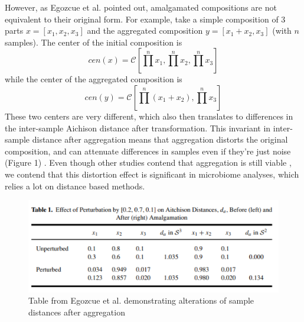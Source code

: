 \documentclass{article}
\begin{document}
\noindent However, as Egozcue et al. \cite{egozcue2005} pointed out, amalgamated compositions are not equivalent to their original form. For example, take a simple composition of 3 parts $x = [x_1, x_2, x_3]$ and the aggregated composition $y = [x_1 + x_2, x_3]$ (with $n$ samples). The center \cite{aitchison} of the initial composition is 
$$cen(x) = \mathcal{C}\left[ \prod^n x_1, \prod^n x_2, \prod^n x_3 \right]$$ 
while the center of the aggregated composition is 
$$cen(y) = \mathcal{C}\left[ \prod^n (x_1 + x_2), \prod^n x_3 \right]$$
These two centers are very different, which also then translates to differences in the inter-sample Aichison distance after transformation. This invariant in inter-sample distance after aggregation means that aggregation distorts the original composition, and can attenuate differences in samples even if they're just noise (Figure 1) \cite{egozcue2005}. Even though other studies contend that aggregation is still viable \cite{greenacre2020}, we contend that this distortion effect is significant in microbiome analyses, which relies a lot on distance based methods.  

\begin{figure}[!htb]
    \centering
    \includegraphics[scale=1.0]{ezogue_tab1.png}
    \caption{Table from Egozcue et al. demonstrating alterations of sample distances after aggregation}
    \label{fig:ezogue_tab1}
\end{figure}
\end{document}
